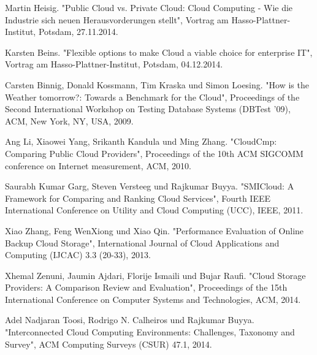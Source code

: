 \ifCLASSOPTIONcaptionsoff
  \newpage
\fi

\begin{thebibliography}{1}
  
Martin Heisig. "Public Cloud vs. Private Cloud: Cloud Computing - Wie die Industrie sich neuen Herausvorderungen stellt", Vortrag am Hasso-Plattner-Institut, Potsdam, 27.11.2014.

Karsten Beins. "Flexible options to make Cloud a viable choice for enterprise IT", Vortrag am Hasso-Plattner-Institut, Potsdam, 04.12.2014.

Carsten Binnig, Donald Kossmann, Tim Kraska und Simon Loesing. "How is the Weather tomorrow?: Towards a Benchmark for the Cloud", Proceedings of the Second International Workshop on Testing Database Systems (DBTest '09), ACM, New York, NY, USA, 2009.

Ang Li, Xiaowei Yang, Srikanth Kandula und Ming Zhang. "CloudCmp: Comparing Public Cloud Providers", Proceedings of the 10th ACM SIGCOMM conference on Internet measurement, ACM, 2010.

Saurabh Kumar Garg, Steven Versteeg und Rajkumar Buyya. "SMICloud: A Framework for Comparing and Ranking Cloud Services", Fourth IEEE International Conference on Utility and Cloud Computing (UCC), IEEE, 2011.

Xiao Zhang, Feng WenXiong und Xiao Qin. "Performance Evaluation of Online Backup Cloud Storage", International Journal of Cloud Applications and Computing (IJCAC) 3.3 (20-33), 2013.

Xhemal Zenuni, Jaumin Ajdari, Florije Ismaili und Bujar Raufi. "Cloud Storage Providers: A Comparison Review and Evaluation", Proceedings of the 15th International Conference on Computer Systems and Technologies, ACM, 2014.

Adel Nadjaran Toosi, Rodrigo N. Calheiros und Rajkumar Buyya. "Interconnected Cloud Computing Environments: Challenges, Taxonomy and Survey", ACM Computing Surveys (CSUR) 47.1, 2014.

\end{thebibliography}